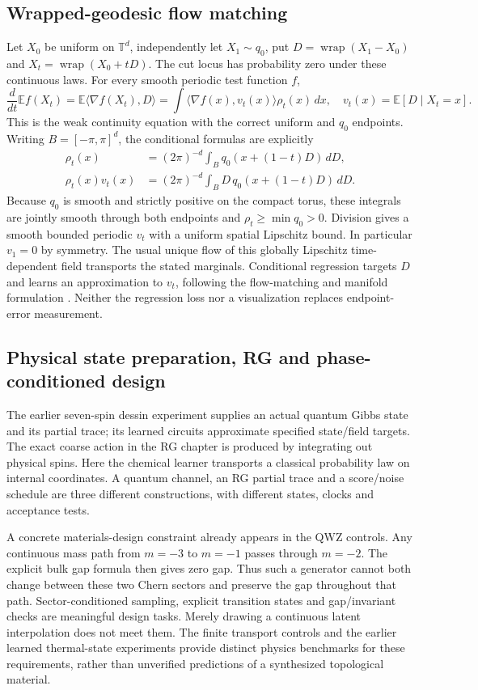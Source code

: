 \documentclass[11pt]{article}
\theoremstyle{definition}\newtheorem{definition}[theorem]{Definition}
\theoremstyle{remark}\newtheorem{remark}[theorem]{Remark}
\begin{document}
\subsection{Wrapped-geodesic flow matching}
Let $X_0$ be uniform on $\mathbb T^d$, independently let $X_1\sim q_0$, put
$D=\operatorname{wrap}(X_1-X_0)$ and
$X_t=\operatorname{wrap}(X_0+tD)$. The cut locus has probability zero under
these continuous laws. For every smooth periodic test function $f$,
\[
 \frac d{dt}\mathbb Ef(X_t)
 =\mathbb E\langle\nabla f(X_t),D\rangle
 =\int\langle\nabla f(x),v_t(x)\rangle\rho_t(x)\,dx,
 \quad v_t(x)=\mathbb E[D\mid X_t=x].
\]
This is the weak continuity equation with the correct uniform and $q_0$
endpoints. Writing $B=[-\pi,\pi]^d$, the conditional formulas are explicitly
\[
 \begin{aligned}
 \rho_t(x)&=(2\pi)^{-d}\int_Bq_0(x+(1-t)D)\,dD,\\
 \rho_t(x)v_t(x)&=(2\pi)^{-d}\int_BD\,q_0(x+(1-t)D)\,dD.
 \end{aligned}
\]
Because $q_0$ is smooth and strictly positive on the compact torus,
these integrals are jointly smooth through both endpoints and
$\rho_t\ge\min q_0>0$. Division gives a smooth bounded periodic $v_t$
with a uniform spatial Lipschitz bound. In particular $v_1=0$ by symmetry. The usual unique flow of this globally Lipschitz
time-dependent field transports the stated marginals. Conditional regression
targets $D$ and learns an approximation to $v_t$, following the flow-matching
and manifold formulation \cite{VisFlow,VisRFM}. Neither the regression loss
nor a visualization replaces endpoint-error measurement.

\subsection{Physical state preparation, RG and phase-conditioned design}
The earlier seven-spin dessin experiment supplies an actual quantum Gibbs
state and its partial trace; its learned circuits approximate specified
state/field targets. The exact coarse action in the RG chapter is produced
by integrating out physical spins. Here the chemical learner transports a
classical probability law on internal coordinates. A quantum channel, an RG
partial trace and a score/noise schedule are three different constructions,
with different states, clocks and acceptance tests.

A concrete materials-design constraint already appears in the QWZ controls.
Any continuous mass path from $m=-3$ to $m=-1$ passes through $m=-2$.
The explicit bulk gap formula then gives zero gap. Thus such a generator
cannot both change between these two Chern sectors and preserve the gap
throughout that path. Sector-conditioned sampling, explicit transition
states and gap/invariant checks are meaningful design tasks. Merely drawing
a continuous latent interpolation does not meet them. The finite transport
controls and the earlier learned thermal-state experiments provide distinct
physics benchmarks for these requirements, rather than unverified
predictions of a synthesized topological material.
\end{document}
